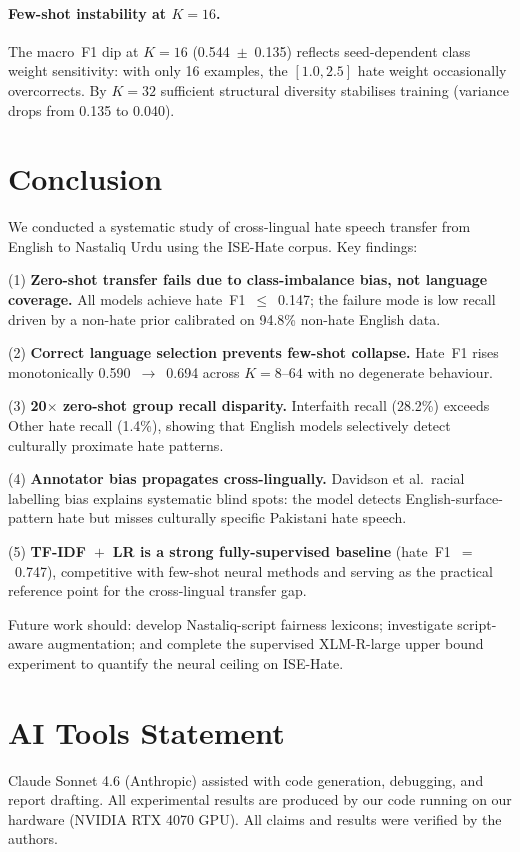 \documentclass{article}
\begin{document}
\paragraph{Few-shot instability at $K=16$.}
The macro~F1 dip at $K=16$ (0.544~$\pm$~0.135) reflects seed-dependent
class weight sensitivity: with only 16 examples, the $[1.0,2.5]$ hate
weight occasionally overcorrects.
By $K=32$ sufficient structural diversity stabilises training
(variance drops from 0.135 to 0.040).

\section{Conclusion}
\label{sec:conclusion}

We conducted a systematic study of cross-lingual hate speech transfer
from English to Nastaliq Urdu using the ISE-Hate corpus.
Key findings:

\noindent(1) \textbf{Zero-shot transfer fails due to class-imbalance bias,
not language coverage.}
All models achieve hate~F1~$\leq$~0.147; the failure mode is low recall
driven by a non-hate prior calibrated on 94.8\% non-hate English data.

\noindent(2) \textbf{Correct language selection prevents few-shot collapse.}
Hate~F1 rises monotonically 0.590~$\to$~0.694 across $K=8$--$64$
with no degenerate behaviour.

\noindent(3) \textbf{20$\times$ zero-shot group recall disparity.}
Interfaith recall (28.2\%) exceeds Other hate recall (1.4\%), showing
that English models selectively detect culturally proximate hate patterns.

\noindent(4) \textbf{Annotator bias propagates cross-lingually.}
Davidson et al.\ racial labelling bias explains systematic blind spots:
the model detects English-surface-pattern hate but misses culturally
specific Pakistani hate speech.

\noindent(5) \textbf{TF-IDF~$+$~LR is a strong fully-supervised baseline}
(hate~F1~$=$~0.747), competitive with few-shot neural methods and
serving as the practical reference point for the cross-lingual transfer gap.

Future work should: develop Nastaliq-script fairness lexicons; investigate
script-aware augmentation; and complete the supervised XLM-R-large
upper bound experiment to quantify the neural ceiling on ISE-Hate.

\section*{AI Tools Statement}
Claude Sonnet 4.6 (Anthropic) assisted with code generation, debugging, and
report drafting. All experimental results are produced by our code running on
our hardware (NVIDIA RTX 4070 GPU). All claims and results were verified by
the authors.



\end{document}
